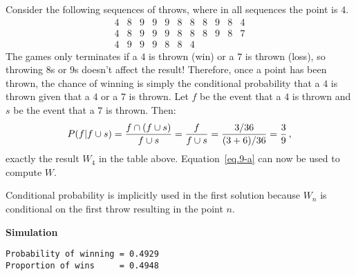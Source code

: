 
 Consider the following sequences of throws, where in all sequences the point is $4$. 
\[
\begin{array}{rrrrrrrrrrr}
4 & 8 & 9 & 9 & 9 & 8 & 8 & 8 & 9 & 8 & 4\\
4 & 8 & 9 & 9 & 9 & 8 & 8 & 8 & 9 & 8 & 7\\
4 & 9 & 9 & 9 & 8 & 8 & 4
\end{array}
\]
The games only terminates if a $4$ is thrown (win) or a $7$ is thrown (loss), so throwing $8$s or $9$s doesn't affect the result! Therefore, once a point has been thrown, the chance of winning is simply the conditional probability that a $4$ is thrown given that a $4$ or  a $7$ is thrown. Let $f$ be the event that a $4$ is thrown and $s$ be the event that a $7$ is thrown. Then:
\[
P(f|f\cup s) = \displaystyle\frac{f\cap(f\cup s)}{f\cup s}=\displaystyle\frac{f}{f\cup s}=\displaystyle\frac{3/36}{(3+6)/36}=\displaystyle\frac{3}{9}\,,
\]
exactly the result $W_4$ in the table above. Equation~\ref{eq.9-a} can now be used to compute $W$.

Conditional probability is implicitly used in the first solution because $W_n$ is conditional on the first throw resulting in the point $n$.

\textbf{Simulation}
\begin{verbatim}
Probability of winning = 0.4929
Proportion of wins     = 0.4948
\end{verbatim}




